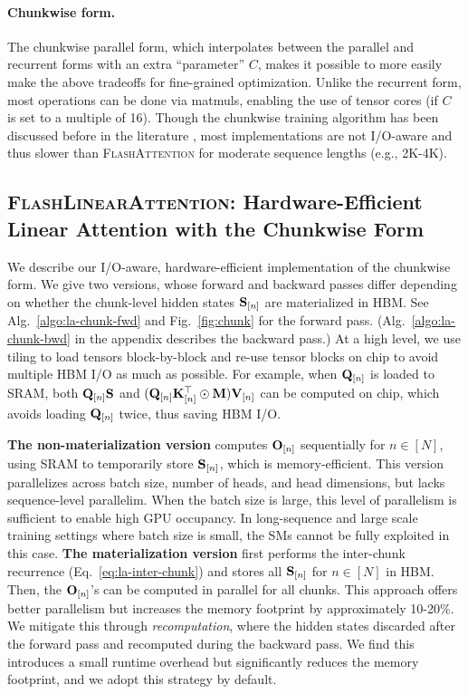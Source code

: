 \vspace{-2mm}
\paragraph{Chunkwise form.} The chunkwise parallel form, which interpolates between the parallel and recurrent forms with an extra ``parameter'' $C$, makes it possible to more easily make the above tradeoffs for fine-grained  optimization. 
Unlike the recurrent form, most operations can be done via matmuls, enabling the use of tensor cores (if $C$ is set to a multiple of 16). 
Though the chunkwise training algorithm has been discussed before in the literature \cite{GAU, sun2023retentive}, most implementations are not I/O-aware and thus slower than \textsc{FlashAttention} for moderate sequence lengths (e.g., 2K-4K). 



\vspace{-2mm}
\subsection{\textnormal{\textsc{FlashLinearAttention}}: Hardware-Efficient  Linear Attention with the Chunkwise Form}
\label{sec:fla}
\vspace{-2mm}
We describe our I/O-aware, hardware-efficient implementation of the chunkwise form. We give two versions, whose forward and backward passes differ depending on whether the chunk-level hidden states  ${\mathbf{S}}_{[n]}$ are materialized in HBM. See Alg.~\ref{algo:la-chunk-fwd} and Fig.~\ref{fig:chunk} for the forward pass. (Alg.~\ref{algo:la-chunk-bwd} in the appendix describes the backward pass.)  At a high level, we use tiling to load tensors block-by-block and re-use tensor blocks on chip to avoid multiple HBM I/O as {much} as possible. For example, when ${\mathbf{Q}}_{[n]}$ is loaded to SRAM, both ${\mathbf{Q}}_{[n]}{\mathbf{S}}$ and $({\mathbf{Q}}_{[n]}{\mathbf{K}}_{[n]}^{\top}\odot{\mathbf{M}}){\mathbf{V}}_{[n]}$ can be computed on chip, which avoids loading ${\mathbf{Q}}_{[n]}$ twice, thus saving HBM I/O. 


\textbf{The non-materialization version} computes ${\mathbf{O}}_{[n]}$ sequentially for $n \in [N]$, using SRAM to temporarily store ${\mathbf{S}}_{[n]}$, which is memory-efficient. This version parallelizes across batch size, number of heads, and head dimensions, but lacks sequence-level parallelim. When the batch size is large, this level of parallelism is sufficient to enable high GPU occupancy. In long-sequence and large scale training settings where batch size is small, the SMs cannot be fully exploited in this case. \textbf{The materialization version} first performs the inter-chunk recurrence (Eq.~\ref{eq:la-inter-chunk}) and stores all ${\mathbf{S}}_{[n]}$ for $n \in [N]$ in HBM. Then, the ${\mathbf{O}}_{[n]}$'s can be computed in parallel for all chunks.  
 This approach offers better parallelism but increases the memory footprint by approximately 10-20\%. We mitigate this through \textit{recomputation}, where the hidden states discarded  after the forward pass and recomputed during the backward pass. We find this introduces a small runtime  overhead but significantly reduces the memory footprint, and  we adopt this strategy by default.



